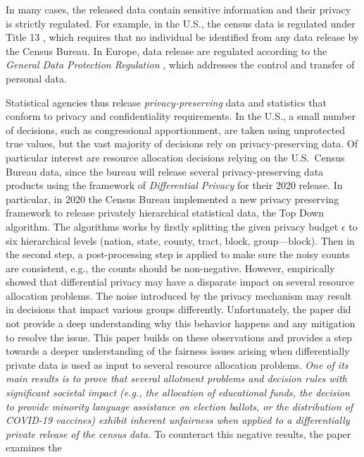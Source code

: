 \documentclass[9pt,lineno,twocolumn,twoside]{pnas-new}
\begin{document}
    In many cases, the released data
    contain sensitive information and their privacy is strictly regulated.
    For example, in the U.S., the census data is regulated under Title 13
    \cite{title13}, which requires that no individual be identified from
    any data release by the Census Bureau. In Europe, data release are
    regulated according to the \emph{General Data Protection Regulation}
    \cite{GDPR}, which addresses the control and transfer of personal data.

    Statistical agencies thus release \emph{privacy-preserving} data and
    statistics that conform to privacy and confidentiality requirements.
    In the U.S., a small number of decisions, such as congressional
    apportionment, are taken using unprotected true values, but the vast
    majority of decisions rely on privacy-preserving data. Of particular
    interest are resource allocation decisions relying on the U.S.~Census
    Bureau data, since the bureau will release several privacy-preserving
    data products using the framework of \emph{Differential Privacy} \cite{abowd2018us}
    for their 2020 release. In particular, in 2020 the Census Bureau implemented a new privacy preserving framework to release privately hierarchical statistical data, the Top Down algorithm. The algorithms works by firstly splitting the given privacy budget $\epsilon$ to six hierarchical levels (nation, state, county, tract, block, group—block). Then in the second step, a post-processing step is applied to make sure the noisy counts are consistent, e.g., the counts should be non-negative.
    However, \cite{pujol:20} empirically showed
    that differential privacy may have a disparate impact on several
    resource allocation problems. The noise introduced by the privacy
    mechanism may result in decisions that impact various groups
    differently. Unfortunately, the paper did not provide a deep understanding why this behavior happens and any mitigation to resolve the issue. This paper builds on these observations and provides a step towards a
    deeper understanding of the fairness issues arising when
    differentially private data is used as input to several resource
    allocation problems.  {\em One of its main results is to prove that
    several allotment problems and decision rules with significant
    societal impact (e.g., the allocation of educational funds, the
    decision to provide minority language assistance on election
    ballots, or the distribution of COVID-19 vaccines) exhibit inherent
    unfairness when applied to a differentially private release of the census
    data.} To counteract this negative results, the paper examines the
\end{document}
